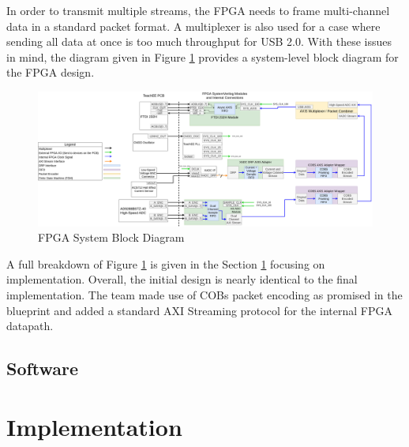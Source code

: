 \documentclass[letterpaper,11pt]{article}
\begin{document}
In order to transmit multiple streams, the FPGA needs to frame multi-channel
data in a standard packet format. A multiplexer is also used for a case where
sending all data at once is too much throughput for USB 2.0. With these issues
in mind, the diagram given in Figure \ref{fig:fpga-block-diagram} provides a
system-level block diagram for the FPGA design.

\begin{figure}[h]
  \centering
  \includegraphics[width=\textwidth]{../../misc/TeachEE-System-Diagram-FPGA.png}
  \caption{FPGA System Block Diagram}
  \label{fig:fpga-block-diagram}
\end{figure}

A full breakdown of Figure \ref{fig:fpga-block-diagram} is given in the Section
\ref{sec:impl} focusing on implementation. Overall, the initial design is nearly
identical to the final implementation. The team made use of COBs packet encoding
as promised in the blueprint and added a standard AXI Streaming protocol for the
internal FPGA datapath.

\subsection{Software} %

\section{Implementation} \label{sec:impl}

\end{document}
